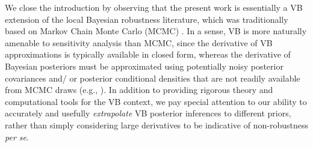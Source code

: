 We close the introduction by observing that  the present work is essentially a
VB extension of the local Bayesian robustness literature, which was
traditionally based on Markov Chain Monte Carlo (MCMC)
\citet{gustafson:1996:local, basu:1996:local}.  In a sense, VB is more naturally
amenable to sensitivity analysis than MCMC, since the derivative of VB
approximations is typically available in closed form, whereas the derivative of
Bayesian posteriors must be approximated using potentially noisy posterior
covariances and/ or posterior conditional densities that are not readily
available from MCMC draws (e.g., \citet{gustafson:1996:marginal}).  In addition
to providing rigorous theory and computational tools for the VB context, we pay
special attention to our ability to accurately and usefully \textit{extrapolate}
VB posterior inferences to different priors, rather than simply considering
large derivatives to be indicative of non-robustness \textit{per se}.
